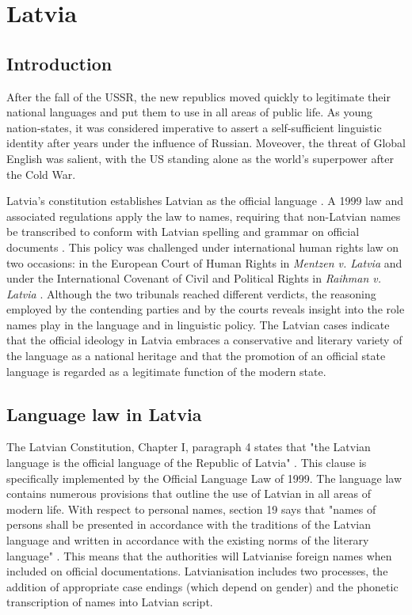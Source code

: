 \section{Latvia}

\subsection{Introduction}

After the fall of the USSR, the new republics moved quickly to legitimate their
national languages and put them to use in all areas of public life. As young
nation-states, it was considered imperative to assert a self-sufficient
linguistic identity after years under the influence of Russian. Moveover, the
threat of Global English was salient, with the US standing alone as the world's
superpower after the Cold War.

Latvia's constitution establishes Latvian as the official language
\parencite{lat-const}. A 1999 law and associated regulations apply the law to
names, requiring that non-Latvian names be transcribed to conform with Latvian
spelling and grammar on official documents \parencite{lat-lang}. This policy
was challenged under international human rights law on two occasions: in the
European Court of Human Rights in \textit{Mentzen v. Latvia}
\parencite{mentzen04} and under the International Covenant of Civil and
Political Rights in \textit{Raihman v. Latvia} \parencite{raihman10}. Although
the two tribunals reached different verdicts, the reasoning employed by the
contending parties and by the courts reveals insight into the role names play
in the language and in linguistic policy. The Latvian cases indicate that the
official ideology in Latvia embraces a conservative and literary variety of the
language as a national heritage and that the promotion of an official state
language is regarded as a legitimate function of the modern state.

\subsection{Language law in Latvia}

The Latvian Constitution, Chapter I, paragraph 4 states that "the Latvian
language is the official language of the Republic of Latvia"
\parencite{lat-const}. This clause is specifically implemented by the Official
Language Law of 1999. The language law contains numerous provisions that
outline the use of Latvian in all areas of modern life. With respect to
personal names, section 19 says that "names of persons shall be presented in
accordance with the traditions of the Latvian language and written in
accordance with the existing norms of the literary language"
\parencite{lat-lang}. This means that the authorities will Latvianise foreign
names when included on official documentations. Latvianisation includes two
processes, the addition of appropriate case endings (which depend on gender)
and the phonetic transcription of names into Latvian script.

